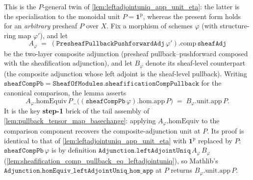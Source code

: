 \begin{lemma}\leanok
  \label{lem:leftadjointuniq_app_unit_eta_general}
  This is the \(P\)-general twin of \cref{lem:leftadjointuniq_app_unit_eta}: the latter is the
  specialisation to the monoidal unit \(P = \mathbf{1}^{\mathrm{p}}\), whereas the present form
  holds for an \emph{arbitrary} presheaf \(P\) over \(X\). Fix a morphism of schemes
  \(\varphi\) (with structure-ring map \(\varphi'\)), and let
  \[
    A_{\varphi}
      \;=\;
    (\mathtt{PresheafPullbackPushforwardAdj}\,\varphi').\mathrm{comp}\,\mathtt{sheafAdj}
  \]
  be the two-layer composite adjunction (presheaf pullback--pushforward composed with the
  sheafification adjunction), and let \(B_{\varphi}\) denote its sheaf-level counterpart (the
  composite adjunction whose left adjoint is the sheaf-level pullback). Writing
  \(\mathtt{sheafCompPb} = \mathtt{SheafOfModules.sheafificationCompPullback}\) for the
  canonical comparison, the lemma asserts
  \[
    A_{\varphi}.\mathrm{homEquiv}\,P\,\_\,\bigl((\mathtt{sheafCompPb}\,\varphi).\mathrm{hom}.\mathrm{app}\,P\bigr)
      \;=\;
    B_{\varphi}.\mathrm{unit}.\mathrm{app}\,P.
  \]
  It is the key \textbf{step-1} brick of the tail assembly of
  \cref{lem:pullback_tensor_map_basechange}: applying \(A_{\varphi}.\mathrm{homEquiv}\) to the
  comparison component recovers the composite-adjunction unit at \(P\). Its proof is identical
  to that of \cref{lem:leftadjointuniq_app_unit_eta} with \(\mathbf{1}^{\mathrm{p}}\) replaced
  by \(P\): \(\mathtt{sheafCompPb}\,\varphi\) is by definition
  \(\mathtt{Adjunction.leftAdjointUniq}\,A_{\varphi}\,B_{\varphi}\)
  (\cref{lem:sheafification_comp_pullback_eq_leftadjointuniq}), so Mathlib's
  \(\mathtt{Adjunction.homEquiv\_leftAdjointUniq\_hom\_app}\) at \(P\) returns
  \(B_{\varphi}.\mathrm{unit}.\mathrm{app}\,P\).
\end{lemma}

